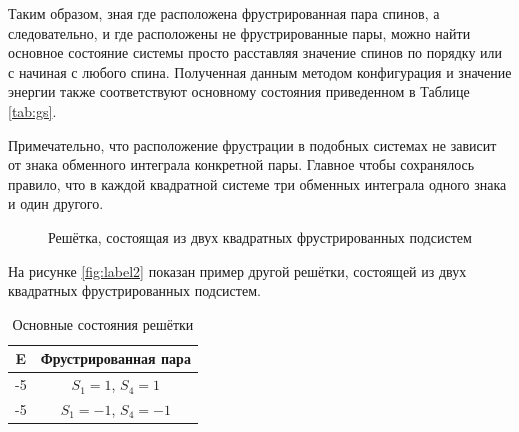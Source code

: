 \documentclass[utf8, babel, sor, jor, amsmath, amssymb, reprint]{elsarticle} %
\begin{document}
Таким образом, зная где расположена фрустрированная пара спинов, а следовательно, и где расположены не фрустрированные пары, можно найти основное состояние системы просто расставляя значение спинов по порядку или с начиная с любого спина. Полученная данным методом конфигурация и значение энергии также соответствуют основному состояния приведенном в Таблице \eqref{tab:gs}.

Примечательно, что расположение фрустрации в подобных системах не зависит от знака обменного интеграла конкретной пары. Главное чтобы сохранялось правило, что в каждой квадратной системе три обменных интеграла одного знака и один другого. 

\begin{figure}[h]
	\centering
	\caption{Решётка, состоящая из двух квадратных фрустрированных подсистем}
	\label{fig:label2}
\end{figure}

На рисунке \eqref{fig:label2} показан пример другой решётки, состоящей из двух квадратных фрустрированных подсистем.

\begin{table}[h]
	\centering
	\begin{tabular}{|c|c|}
		\hline
		E   &   Фрустрированная пара \\
		\hline
		-5   &  $S_1=1$, $S_4=1$ \\
		\hline
		-5   &   $S_1=-1$, $S_4=-1$ \\
		\hline
	\end{tabular}
	\caption{Основные состояния решётки}
	\label{tab:gs2}
\end{table}
\end{document}
